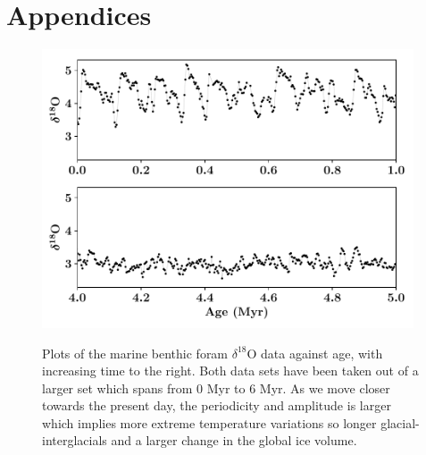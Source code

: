 \documentclass[12pt, onecolumn]{revtex4}    %
\begin{document}


\newpage





\newpage

\section*{Appendices}
\begin{figure}[!h]
\begin{center}
\includegraphics[width=11cm]{figures/foram_data}
\caption[]{Plots of the marine benthic foram $\delta^{18}$O data against age, with increasing time to the right. Both data sets have been taken out of a larger set which spans from 0 Myr to 6 Myr. As we move closer towards the present day, the periodicity and amplitude is larger which implies more extreme temperature variations so longer glacial-interglacials and a larger change in the global ice volume.}
\vspace{-3ex}
\label{fig:foram_data}
\end{center}
\end{figure}
\end{document}
